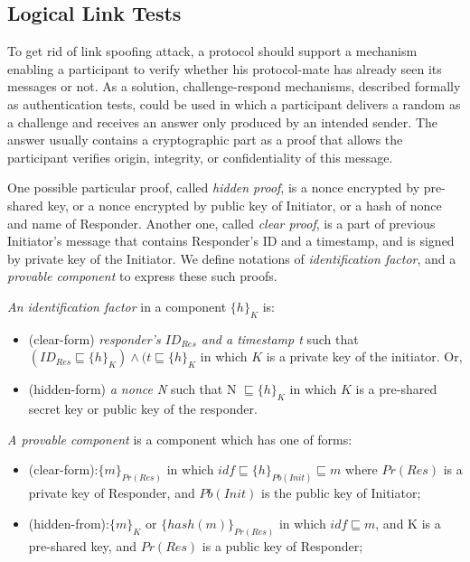 \subsection{Logical Link Tests}

To get rid of link spoofing attack, a protocol should support a mechanism enabling a participant to verify whether his protocol-mate has already seen its messages or not. As a solution, challenge-respond mechanisms, described formally as authentication tests, could be used in which a participant delivers a random as a challenge and receives an answer only produced by an intended sender. The answer usually contains a cryptographic part as a proof that allows the participant verifies origin, integrity, or confidentiality of this message. 

One possible particular proof, called \textit{hidden proof}, is a nonce encrypted by pre-shared key, or a nonce encrypted by public key of Initiator, or a hash of nonce and name of Responder. Another one, called \textit{clear proof}, is a part of previous Initiator's message that contains Responder's ID and a timestamp, and is signed by private key of the Initiator. We define notations of \emph{identification factor}, and a \emph{provable component} to express these such proofs. 

\begin{Definition} \emph{An identification factor} in a component $\{h\}_K$ is:
\begin{itemize}
	\item(clear-form) \emph{responder's $ID_{Res}$ and a timestamp t} such that $(ID_{Res} \sqsubseteq \{h\}_K ) \wedge (t \sqsubseteq \{h\}_K$ in which $K$ is a private key of the initiator. Or, 
	\item(hidden-form) \emph{a nonce N} such that N $\sqsubseteq \{h\}_K$ in which $K$ is a pre-shared secret key or public key of the responder.\end{itemize}
\end{Definition}

\begin{Definition}\emph{A provable component} is a component which has one of forms:
\begin{itemize}
	\item (clear-form):$\{m\}_{Pr(Res)}$ in which $idf \sqsubseteq \{h\}_{Pb(Init)} \sqsubseteq m$ where $Pr(Res)$ is a private key of Responder, and $Pb(Init)$ is the public key of Initiator;  
	\item (hidden-from):$\{m\}_K$ or $\{hash(m)\}_{Pr(Res)}$ in which $idf \sqsubseteq m$, and K is a pre-shared key, and $Pr(Res)$ is a public key of Responder;
\end{itemize}
\end{Definition}


